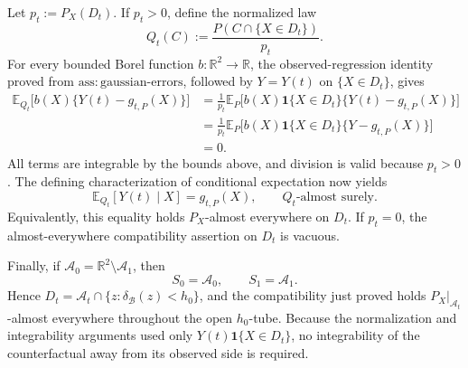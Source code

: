 Let \(p_t:=P_X(D_t)\).  If \(p_t>0\), define the normalized law
\[
Q_t(C):=\frac{P(C\cap\{X\in D_t\})}{p_t}.
\]
For every bounded Borel function \(b:\mathbb R^2\to\mathbb R\), the observed-regression identity proved from \(\mathrm{ass:gaussian\text{-}errors}\), followed by \(Y=Y(t)\) on \(\{X\in D_t\}\), gives
\[
\begin{aligned}
\mathbb E_{Q_t}\bigl[b(X)\{Y(t)-g_{t,P}(X)\}\bigr]
&=\frac{1}{p_t}\mathbb E_P\bigl[b(X)\mathbf 1\{X\in D_t\}\{Y(t)-g_{t,P}(X)\}\bigr]\\
&=\frac{1}{p_t}\mathbb E_P\bigl[b(X)\mathbf 1\{X\in D_t\}\{Y-g_{t,P}(X)\}\bigr]\\
&=0.
\end{aligned}
\]
All terms are integrable by the bounds above, and division is valid because \(p_t>0\).  The defining characterization of conditional expectation now yields
\[
\mathbb E_{Q_t}[Y(t)\mid X]=g_{t,P}(X),
\qquad Q_t\text{-almost surely}.
\]
Equivalently, this equality holds \(P_X\)-almost everywhere on \(D_t\).  If \(p_t=0\), the almost-everywhere compatibility assertion on \(D_t\) is vacuous.

Finally, if \(\mathcal A_0=\mathbb R^2\setminus\mathcal A_1\), then
\[
S_0=\mathcal A_0,
\qquad
S_1=\mathcal A_1.
\]
Hence \(D_t=\mathcal A_t\cap\{z:\delta_{\mathcal B}(z)<h_0\}\), and the compatibility just proved holds \(P_X|_{\mathcal A_t}\)-almost everywhere throughout the open \(h_0\)-tube.  Because the normalization and integrability arguments used only \(Y(t)\mathbf 1\{X\in D_t\}\), no integrability of the counterfactual away from its observed side is required.
